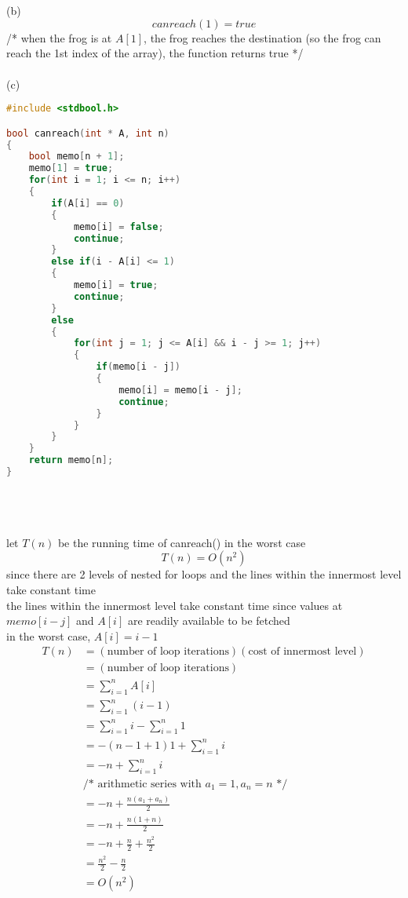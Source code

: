 \documentclass[12pt,border=4pt,multi]{article}%
\begin{document}
\\
\\
(b)
\[canreach(1) = true\]
/* when the frog is at $A[1]$, the frog reaches the destination
(so the frog can reach the 1st index of the array), the function returns true */
\\
\\
\newpage
\noindent
(c)
\begin{lstlisting}[language = c]
#include <stdbool.h>

bool canreach(int * A, int n)
{
    bool memo[n + 1];
    memo[1] = true;
    for(int i = 1; i <= n; i++)
    {
        if(A[i] == 0)
        {
            memo[i] = false;
            continue;
        }
        else if(i - A[i] <= 1)
        {
            memo[i] = true;
            continue;
        }
        else
        {
            for(int j = 1; j <= A[i] && i - j >= 1; j++)
            {
                if(memo[i - j])
                {
                    memo[i] = memo[i - j];
                    continue;
                }
            }
        }
    }
    return memo[n];
}
\end{lstlisting}
\leavevmode
\\
\\
\\
let $T(n)$ be the running time of canreach() in the worst case
\[T(n) = O(n^2)\]
since there are 2 levels of nested for loops and the lines within the innermost level take constant time\\
the lines within the innermost level take constant time since values at $memo[i - j]$ and $A[i]$ are readily available to be fetched\\
in the worst case, $A[i] = i - 1$\\
\begin{align*}
    T(n) &= (\text{number of loop iterations})(\text{cost of innermost level})\\
    &= (\text{number of loop iterations})\\
    &= \sum_{i = 1}^n A[i]\\
    &= \sum_{i = 1}^n (i - 1)\\
    &= \sum_{i = 1}^n i - \sum_{i = 1}^n 1\\
    &= - (n - 1 + 1)1 + \sum_{i = 1}^n i\\
    &= - n + \sum_{i = 1}^n i\\
    &\text{/* arithmetic series with } a_1 = 1, a_n = n \text{ */}\\
    &= -n + \frac{n(a_1 + a_n)}{2}\\
    &= -n + \frac{n(1 + n)}{2}\\
    &= -n + \frac{n}{2} + \frac{n^2}{2}\\
    &= \frac{n^2}{2} - \frac{n}{2}\\
    &= O(n^2)\\
\end{align*}
\end{document}
